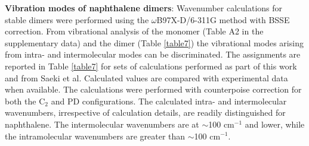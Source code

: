 \textbf{Vibration modes of naphthalene dimers}: Wavenumber calculations for stable dimers were performed using the $\omega$B97X-D/6-311G method with BSSE correction. From vibrational analysis of the monomer (Table A2 in the supplementary data) and the dimer (Table \ref{table7}) the vibrational modes arising from intra- and intermolecular modes can be discriminated. The assignments are reported in Table \ref{table7} for sets of calculations performed as part of this work and from Saeki et al\cite{saeki2006theoretical}. Calculated values are compared with experimental data when available. The calculations were performed with counterpoise correction for both the C$_{2}$ and PD configurations. The calculated intra- and intermolecular wavenumbers, irrespective of calculation details, are readily distinguished for naphthalene. The intermolecular wavenumbers are at $\sim$100 cm$^{-1}$ and lower, while the intramolecular wavenumbers are greater than $\sim$100 cm$^{-1}$.

